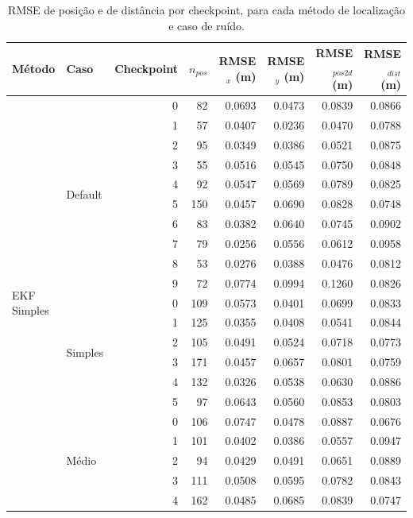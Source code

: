 \begin{table}[htbp]
  \centering
  \caption{RMSE de posi\c{c}\~ao e de dist\^ancia por checkpoint, para cada m\'etodo de localiza\c{c}\~ao e caso de ru\'ido.}
  \label{tab:saida-resultados}
  \small
  \begin{tabular}{llrrrrrr}
    \toprule
    M\'etodo & Caso & Checkpoint & $n_{pos}$ & RMSE$_x$ (m) & RMSE$_y$ (m) & RMSE$_{pos2d}$ (m) & RMSE$_{dist}$ (m) \\
    \midrule
    \multirow{34}{*}{EKF Simples} & \multirow{10}{*}{Default} & 0 & 82 & 0.0693 & 0.0473 & 0.0839 & 0.0866 \\
     &  & 1 & 57 & 0.0407 & 0.0236 & 0.0470 & 0.0788 \\
     &  & 2 & 95 & 0.0349 & 0.0386 & 0.0521 & 0.0875 \\
     &  & 3 & 55 & 0.0516 & 0.0545 & 0.0750 & 0.0848 \\
     &  & 4 & 92 & 0.0547 & 0.0569 & 0.0789 & 0.0825 \\
     &  & 5 & 150 & 0.0457 & 0.0690 & 0.0828 & 0.0748 \\
     &  & 6 & 83 & 0.0382 & 0.0640 & 0.0745 & 0.0902 \\
     &  & 7 & 79 & 0.0256 & 0.0556 & 0.0612 & 0.0958 \\
     &  & 8 & 53 & 0.0276 & 0.0388 & 0.0476 & 0.0812 \\
     &  & 9 & 72 & 0.0774 & 0.0994 & 0.1260 & 0.0826 \\
    \cmidrule(lr){2-8}
     & \multirow{6}{*}{Simples} & 0 & 109 & 0.0573 & 0.0401 & 0.0699 & 0.0833 \\
     &  & 1 & 125 & 0.0355 & 0.0408 & 0.0541 & 0.0844 \\
     &  & 2 & 105 & 0.0491 & 0.0524 & 0.0718 & 0.0773 \\
     &  & 3 & 171 & 0.0457 & 0.0657 & 0.0801 & 0.0759 \\
     &  & 4 & 132 & 0.0326 & 0.0538 & 0.0630 & 0.0886 \\
     &  & 5 & 97 & 0.0643 & 0.0560 & 0.0853 & 0.0803 \\
    \cmidrule(lr){2-8}
     & \multirow{8}{*}{M\'edio} & 0 & 106 & 0.0747 & 0.0478 & 0.0887 & 0.0676 \\
     &  & 1 & 101 & 0.0402 & 0.0386 & 0.0557 & 0.0947 \\
     &  & 2 & 94 & 0.0429 & 0.0491 & 0.0651 & 0.0889 \\
     &  & 3 & 111 & 0.0508 & 0.0595 & 0.0782 & 0.0843 \\
     &  & 4 & 162 & 0.0485 & 0.0685 & 0.0839 & 0.0747 \\

\end{tabular}
\end{table}
